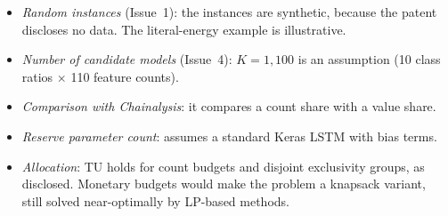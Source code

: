 \documentclass[10pt,a4paper]{article}
\begin{document}
\begin{itemize}
\begin{itemize}
    \item \emph{Random instances} (Issue~1): the instances are synthetic, because the patent discloses no data. The literal-energy example is illustrative.
    \item \emph{Number of candidate models} (Issue~4): $K=1{,}100$ is an assumption (10 class ratios $\times$ 110 feature counts).
    \item \emph{Comparison with Chainalysis}: it compares a count share with a value share.
    \item \emph{Reserve parameter count}: assumes a standard Keras LSTM with bias terms.
    \item \emph{Allocation}: TU holds for count budgets and disjoint exclusivity groups, as disclosed. Monetary budgets would make the problem a knapsack variant, still solved near-optimally by LP-based methods.
  \end{itemize}
\end{itemize}

\end{document}
